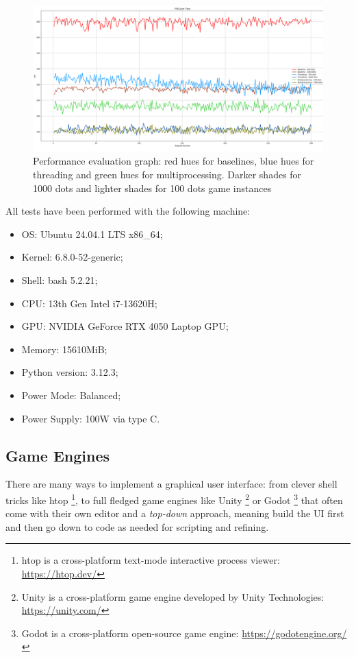 \begin{figure}[h]
  \centering
  \includegraphics[width=\linewidth]{images/performance_eval_fps_graph.png}
  \caption{Performance evaluation graph: red hues for baselines, blue hues for threading and green hues for multiprocessing. Darker shades for 1000 dots and lighter shades for 100 dots game instances}
  \label{fig:peval}
\end{figure}

All tests have been performed with the following machine: 

\begin{itemize}
    \item OS: Ubuntu 24.04.1 LTS x86\_64;
    \item Kernel: 6.8.0-52-generic;
    \item Shell: bash 5.2.21;
    \item CPU: 13th Gen Intel i7-13620H;
    \item GPU: NVIDIA GeForce RTX 4050 Laptop GPU;
    \item Memory: 15610MiB;
    \item Python version: 3.12.3;
    \item Power Mode: Balanced;
    \item Power Supply: 100W via type C.
\end{itemize}

\subsection{Game Engines} \label{sec:pygame}

There are many ways to implement a graphical user interface: from clever shell tricks like htop \footnote{htop is a cross-platform text-mode interactive process viewer: \url{https://htop.dev/}}, to full fledged game engines like Unity \footnote{Unity is a cross-platform game engine developed by Unity Technologies: \url{https://unity.com/}} or Godot \footnote{Godot is a cross-platform open-source game engine: \url{https://godotengine.org/}} that often come with their own editor and a \textit{top-down} approach, meaning build the UI first and then go down to code as needed for scripting and refining.

